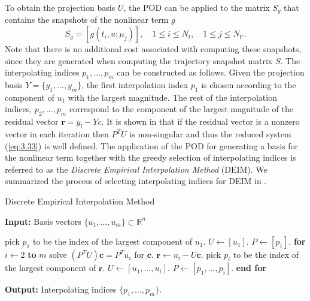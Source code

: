 To obtain the projection basis $U$, the POD can be applied to the matrix $S_g$ that contains the snapshots of the nonlinear term $g$
\begin{equation} \label{eq:3.34}
	S_g = [g(t_i,u;\mu_j)],\quad 1\leq i \leq N_t,\quad 1 \leq j \leq N_{\mathbb P}.
\end{equation}
Note that there is no additional cost associated with computing these snapshots, since they are generated when computing the trajectory snapshot matrix $S$. The interpolating indices $p_1,\dots,p_m$ can be constructed as follows. Given the projection basis $Y = \{y_1,\dots,y_m\}$, the first interpolation index $p_1$ is chosen according to the component of $u_1$ with the largest magnitude. The rest of the interpolation indices, $p_2,\dots,p_m$ correspond to the component of the largest magnitude of the residual vector $\mathbf r = y_l - Y c$. It is shown in \cite{doi:10.1137/090766498} that if the residual vector is a nonzero vector in each iteration then $P^TU$ is non-singular and thus the reduced system (\ref{eq:3.33}) is well defined. The application of the POD for generating a basis for the nonlinear term together with the greedy selection of interpolating indices is referred to as the \emph{Discrete Empirical Interpolation Method} (DEIM). We summarized the process of selecting interpolating indices for DEIM in .

\begin{algorithm} 
\caption{Discrete Empirical Interpolation Method} \label{alg:3.4}
{\bf Input:}  Basis vectors $\{u_1,\dots , u_m\}\subset \mathbb R^n$
\begin{algorithmic} [1]
	\State pick $p_1$ to be the index of the largest component of $u_1$.
	\State $U \leftarrow [u_1]$.
	\State $P \leftarrow [p_1]$.
	\State \textbf{for} $i\leftarrow 2$ \textbf{to} $m$
		\State \hspace{0.5cm} solve $(P^TU)\mathbf c = P^T u_i$ for $\mathbf c$.
		\State \hspace{0.5cm} $\mathbf r \leftarrow u_i - U\mathbf c$.
		\State \hspace{0.5cm} pick $p_i$ to be the index of the largest component of $\mathbf r$.
		\State \hspace{0.5cm} $U \leftarrow [u_1,\dots,u_i]$.
		\State \hspace{0.5cm} $P \leftarrow [p_1,\dots,p_i]$.
	\State \textbf{end for}
\end{algorithmic}
\vspace{0.5cm}
{\bf Output:} Interpolating indices $\{p_1,\dots,p_m\}$.
\end{algorithm}


